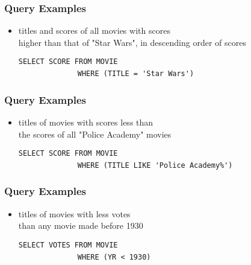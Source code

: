 \documentclass[dvipsnames]{beamer}
\theoremstyle{plain}
\begin{document}
\begin{frame}[fragile]
  \frametitle{Query Examples}

  \begin{itemize}
    \item titles and scores of all movies with scores\\
      higher than that of "Star Wars", in descending order of scores

      \medskip
{}
\lstinline!SELECT SCORE FROM MOVIE!\\
~~~~~~~~~~~~~~\lstinline!WHERE (TITLE = 'Star Wars')!
  \end{itemize}
\end{frame}

\begin{frame}[fragile]
  \frametitle{Query Examples}

  \begin{itemize}
    \item titles of movies with scores less than\\
      the scores of all "Police Academy" movies

    \medskip
{}
\lstinline!SELECT SCORE FROM MOVIE!\\
~~~~~~~~~~~~~~\lstinline!WHERE (TITLE LIKE 'Police Academy%')!
  \end{itemize}
\end{frame}

\begin{frame}[fragile]
  \frametitle{Query Examples}

  \begin{itemize}
    \item titles of movies with less votes\\
      than any movie made before 1930

    \medskip
{}
\lstinline!SELECT VOTES FROM MOVIE!\\
~~~~~~~~~~~~~~\lstinline!WHERE (YR < 1930)!
  \end{itemize}
\end{frame}
\end{document}
